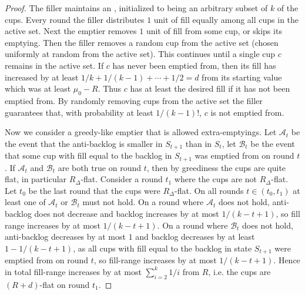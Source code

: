 \begin{proof}
  The filler maintains an , initialized to being
  an arbitrary subset of $k$ of the cups. Every round the filler
  distributes $1$ unit of fill equally among all cups in the
  active set. Next the emptier removes $1$ unit of fill from some
  cup, or skips its emptying. Then the filler removes a random
  cup from the active set (chosen uniformly at random from the
  active set). This continues until a single cup $c$ remains in
  the active set. 
  If $c$ has never been emptied from, then its fill has increased
  by at least $1/k + 1/(k-1) + \cdots + 1/2 = d$
  from its starting value which was at least $\mu_0 -R$. Thus $c$
  has at least the desired fill if it has not been emptied from.
  By randomly removing cups from the active set the filler
  guarantees that, with probability at least $1/(k-1)!$, $c$ is not
  emptied from.

  Now we consider a greedy-like emptier that is allowed
  extra-emptyings. Let $\mathcal{A}_t$ be the event that the
  anti-backlog is smaller in $S_{t+1}$ than in $S_t$, let
  $\mathcal{B}_t$ be the event that some cup with fill equal to
  the backlog in $S_{t+1}$ was emptied from on round $t$. If
  $\mathcal{A}_t$ and $\mathcal{B}_t$ are both true on round $t$,
  then by greediness the cups are quite flat, in particular
  $R_\Delta$-flat. Consider a round $t_1$ where the cups are not
  $R_\Delta$-flat. Let $t_0$ be the last round that the cups were
  $R_\Delta$-flat. On all rounds $t \in (t_0, t_1)$ at least one
  of $\mathcal{A}_t$ or $\mathcal{B}_t$ must not hold. On a round
  where $\mathcal{A}_t$ does not hold, anti-backlog does not
  decrease and backlog increases by at most $1/(k-t+1)$, so fill
  range increases by at most $1/(k-t+1).$ On a round where
  $\mathcal{B}_t$ does not hold, anti-backlog decreases by at
  most $1$ and backlog decreases by at least $1-1/(k-t+1)$, as
  all cups with fill equal to the backlog in state $S_{t+1}$ were
  emptied from on round $t$, so fill-range increases by at most
  $1/(k-t+1)$. 
  Hence in total fill-range increases by at most $\sum_{i=2}^k
  1/i$ from $R$, i.e. the cups are $(R+d)$-flat on round $t_1$.

\end{proof}

